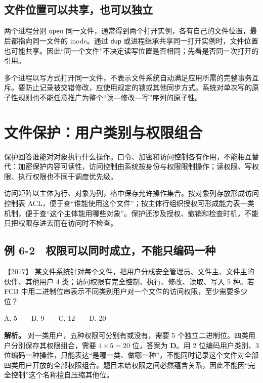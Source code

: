 \subsection{文件位置可以共享，也可以独立}\label{os-c06-h41}

两个进程分别 \allowbreak{}\texttt{open} 同一文件，通常得到两个打开实例，各有自己的文件位置，最后都指向同一文件的 inode。通过 \allowbreak{}\texttt{dup} 或进程继承共享同一打开实例时，文件位置也可能共享。因此``同一个文件''不决定读写位置是否相同；先看是否同一次打开的引用。

多个进程以写方式打开同一文件，不表示文件系统自动满足应用所需的完整事务互斥。要防止记录被交错修改，应使用规定的锁或其他同步方式。系统对单次写的原子性规则也不能任意推广为整个``读---修改---写''序列的原子性。

\section{文件保护：用户类别与权限组合}\label{os-6-3}

保护回答谁能对对象执行什么操作。口令、加密和访问控制各有作用，不能相互替代：加密保护内容可读性，访问控制由系统按身份与权限限制操作；读权限、写权限、执行权限也不同于调度优先级。

访问矩阵以主体为行、对象为列，格中保存允许操作集合。按对象列存放形成访问控制表 ACL，便于查``谁能使用这个文件''；按主体行组织授权可形成能力表一类机制，便于查``这个主体能用哪些对象''。保护还涉及授权、撤销和检查时机，不能只把权限存进去而在访问时不检查。

\subsection{例 6-2　权限可以同时成立，不能只编码一种}\label{os-ex6-2}

\noindent{}【2017】 某文件系统针对每个文件，把用户分成安全管理员、文件主、文件主的伙伴、其他用户 4 类；访问权限有完全控制、执行、修改、读取、写入 5 种。若 FCB 中用二进制位串表示不同类别用户对一个文件的访问权限，至少需要多少位？

A. 5　　B. 9　　C. 12　　D. 20


\textbf{解析。} 对一类用户，五种权限可分别有或没有，需要 5 个独立二进制位。四类用户分别保存其权限组合，需要 \(4\times5=20\) 位，答案为 \textbf{D}。用 2 位编码用户类别、3 位编码一种操作，只能表达``是哪一类、做哪一种''，不能同时记录这个文件对全部四类用户开放的全部权限组合。题目未给权限之间必然蕴含关系，因此不能因``完全控制''这个名称擅自压缩其他位。

